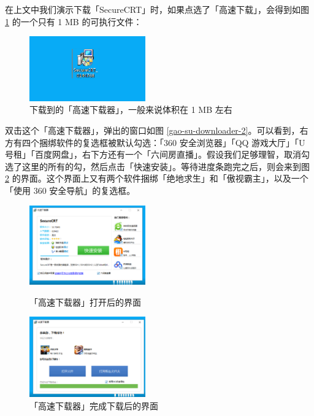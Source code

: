 在上文中我们演示下载「SecureCRT」时，如果点选了「高速下载」，会得到如图 \ref{gao-su-downloader-1} 的一个只有 1 MB 的可执行文件：

\begin{figure}[H]
  \centering
  \includegraphics[width=5cm]{assets/Gao_su_1.png}
  \caption{下载到的「高速下载器」，一般来说体积在 1 MB 左右}
  \label{gao-su-downloader-1}
\end{figure}

双击这个「高速下载器」，弹出的窗口如图 \ref{gao-su-downloader-2}。可以看到，右方有四个捆绑软件的复选框被默认勾选：「360 安全浏览器」「QQ 游戏大厅」「U 号租」「百度网盘」，右下方还有一个「六间房直播」。假设我们足够理智，取消勾选了这里的所有的勾，然后点击「快速安装」。等待进度条跑完之后，则会来到图 \ref{gao-su-downloader-3} 的界面。这个界面上又有两个软件捆绑「绝地求生」和「傲视霸主」，以及一个「使用 360 安全导航」的复选框。

\begin{figure}[htb!]
  \centering
  \begin{minipage}{6cm}
    \centering
    \includegraphics[width=5cm]{assets/Gao_su_2.png}
    \caption{「高速下载器」打开后的界面}
    \label{gao-su-downloader-2}
  \end{minipage}
  \qquad
  \begin{minipage}{6cm}
    \centering
    \includegraphics[width=5cm]{assets/Gao_su_3.png}
    \caption{「高速下载器」完成下载后的界面}
    \label{gao-su-downloader-3}
  \end{minipage} 
\end{figure}


